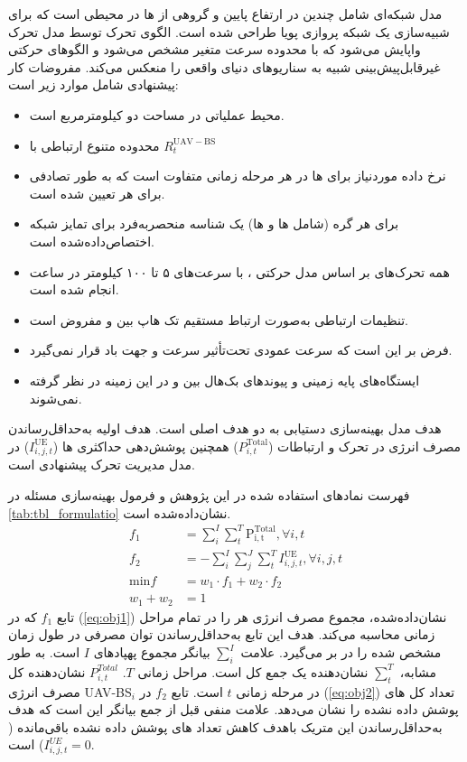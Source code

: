  مدل شبکه‌ای شامل چندین  در ارتفاع پایین و گروهی از ها در محیطی است که برای شبیه‌سازی یک شبکه  پروازی پویا طراحی شده است. الگوی تحرک  توسط مدل تحرک  واپایش می‌شود که با محدوده سرعت متغیر مشخص می‌شود و الگوهای حرکتی غیرقابل‌پیش‌بینی شبیه به سناریوهای دنیای واقعی را منعکس می‌کند. مفروضات کار پیشنهادی شامل موارد زیر است: 
 \begin{itemize}
 	\item 
 	محیط عملیاتی  در مساحت دو کیلومترمربع است.
 	\item
 	محدوده متنوع ارتباطی  با $R_{t}^ \mathrm{ \mathrm{{UAV-BS}}}$ 
 	\item 
 	نرخ داده موردنیاز برای ها در هر مرحله زمانی متفاوت است که به طور تصادفی برای هر  تعیین شده است.
 	\item 
 	برای هر گره (شامل ها و ها) یک شناسه منحصربه‌فرد برای تمایز شبکه اختصاص‌داده‌شده است.
 	\item 
 	همه تحرک‌های  بر اساس مدل حرکتی ، با سرعت‌های ۵ تا ۱۰۰ کیلومتر در ساعت انجام شده است.
 	\item 
 	تنظیمات ارتباطی به‌صورت ارتباط مستقیم تک هاپ بین  و  مفروض است.
 	\item
 	فرض بر این است که سرعت عمودی  تحت‌تأثیر سرعت و جهت باد قرار نمی‌گیرد.
 	\item
 	ایستگاه‌های پایه زمینی و پیوندهای بک‌هال بین  و  در این زمینه در نظر گرفته نمی‌شوند.
 \end{itemize}
 هدف مدل بهینه‌سازی دستیابی به دو هدف اصلی است. هدف اولیه به‌حداقل‌رساندن مصرف انرژی در تحرک و ارتباطات ($P_{i,t}^{\mathrm{Total}}$) همچنین پوشش‌دهی حداکثری ها ($I_{i,j,t}^{\mathrm{UE}}$) در مدل مدیریت تحرک پیشنهادی است.
 
 فهرست نمادهای استفاده شده در این پژوهش و فرمول بهینه‌سازی مسئله در \autoref{tab:tbl_formulatio} نشان‌داده‌شده است.
\begin{align}
f_{1}&=\sum_{i}^{I}\sum_{t}^{T}  \mathrm{P_{i,t}^{Total}} , \forall i, t \label{eq:obj1} \\
f_{2}&=-\sum_{i}^{I} \sum_{j}^{J}\sum_{t}^{T} I_{i,j,t}^{ \mathrm{UE}} , \forall i, j, t \label{eq:obj2}\\
\mathrm{min} f&=w_{1} \cdot f_{1}+w_2 \cdot f_{2} \label{eq:min}\\
w_{1}+w_{2}&=1 \label{eq:wheights}
\end{align}  
تابع $f_{1}$ که در (\autoref{eq:obj1}) نشان‌داده‌شده، مجموع مصرف انرژی هر  را در تمام مراحل زمانی محاسبه می‌کند. هدف این تابع به‌حداقل‌رساندن توان مصرفی  در طول زمان مشخص شده را در بر می‌گیرد. علامت $\sum_{i}^{I}$ بیانگر مجموع پهپادهای $I$ است. به طور مشابه، $\sum_{t}^{T}$ نشان‌دهنده یک جمع کل است. مراحل زمانی $T$. $P_{i,t}^{Total}$ نشان‌دهنده کل مصرف انرژی UAV-BS$_{i}$ در مرحله زمانی $t$ است. تابع $f_{2}$ در (\autoref{eq:obj2}) تعداد کل های پوشش داده نشده را نشان می‌دهد. علامت منفی قبل از جمع بیانگر این است که هدف به‌حداقل‌رساندن این متریک باهدف کاهش تعداد های پوشش داده نشده باقی‌مانده ($I_{i,j,t}^{UE} = 0$) است.

